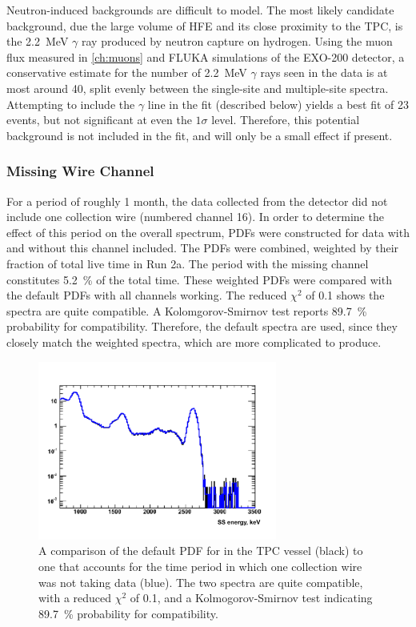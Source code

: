\documentclass[herrin-thesis.tex]{subfiles}
\begin{document}
Neutron-induced backgrounds are difficult to model. The most likely candidate background, due the large volume of HFE and its close proximity to the TPC, is the \SI{2.2}{\MeV} \(\gamma\) ray produced by neutron capture on hydrogen. Using the muon flux measured in \cref{ch:muons} and FLUKA \cite{Ferrari:2005zk} simulations of the EXO-200 detector, a conservative estimate for the number of \SI{2.2}{\MeV} \(\gamma\) rays seen in the data is at most around 40, split evenly between the single-site and multiple-site spectra. Attempting to include the \(\gamma\) line in the fit (described below) yields a best fit of 23 events, but not significant at even the \(1\sigma\) level. Therefore, this potential background is not included in the fit, and will only be a small effect if present.

\subsubsection{Missing Wire Channel}
For a period of roughly 1 month, the data collected from the detector did not include one collection wire (numbered channel 16). In order to determine the effect of this period on the overall spectrum, PDFs were constructed for data with and without this channel included. The PDFs were combined, weighted by their fraction of total live time in Run 2a. The period with the missing channel constitutes \SI{5.2}{\percent} of the total time. These weighted PDFs were compared with the default PDFs with all channels working. The reduced \(\chi^2\) of 0.1 shows the spectra are quite compatible. A Kolomgorov-Smirnov test reports \SI{89.7}{\percent} probability for compatibility. Therefore, the default spectra are used, since they closely match the weighted spectra, which are more complicated to produce.

\begin{figure}[htbp]
\centering
\includegraphics[width=0.7\textwidth]{./plots/analysis_missing_channel16_comparison.pdf}
\caption[Comparison of default PDF to PDF with missing channel]{A comparison of the default PDF for  in the TPC vessel (black) to one that accounts for the time period in which one collection wire was not taking data (blue). The two spectra are quite compatible, with a reduced \(\chi^2\) of 0.1, and a Kolmogorov-Smirnov test indicating \SI{89.7}{\percent} probability for compatibility.}
\label{fig:analysis_missing_channel16_comparison}
\end{figure}
\end{document}
